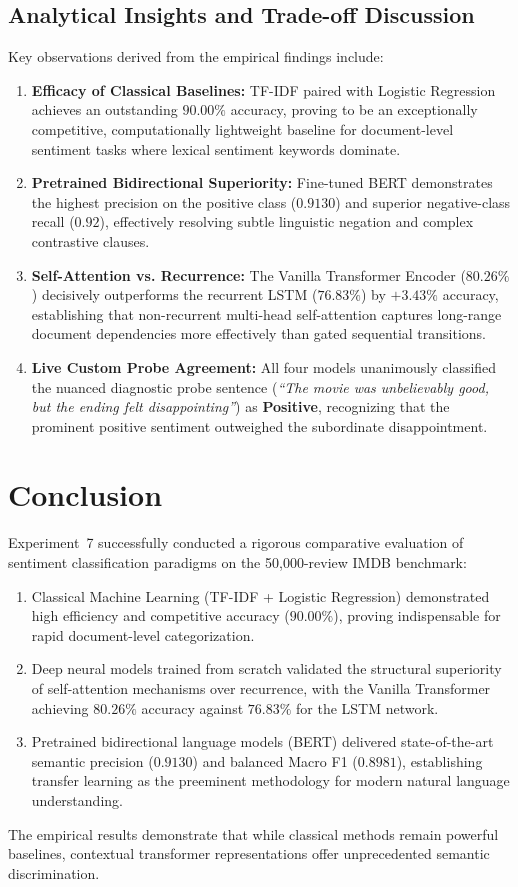 \subsection{Analytical Insights and Trade-off Discussion}
Key observations derived from the empirical findings include:
\begin{enumerate}
    \item \textbf{Efficacy of Classical Baselines:} TF-IDF paired with Logistic Regression achieves an outstanding $90.00\%$ accuracy, proving to be an exceptionally competitive, computationally lightweight baseline for document-level sentiment tasks where lexical sentiment keywords dominate.
    \item \textbf{Pretrained Bidirectional Superiority:} Fine-tuned BERT demonstrates the highest precision on the positive class ($0.9130$) and superior negative-class recall ($0.92$), effectively resolving subtle linguistic negation and complex contrastive clauses.
    \item \textbf{Self-Attention vs. Recurrence:} The Vanilla Transformer Encoder ($80.26\%$) decisively outperforms the recurrent LSTM ($76.83\%$) by $+3.43\%$ accuracy, establishing that non-recurrent multi-head self-attention captures long-range document dependencies more effectively than gated sequential transitions.
    \item \textbf{Live Custom Probe Agreement:} All four models unanimously classified the nuanced diagnostic probe sentence (\textit{``The movie was unbelievably good, but the ending felt disappointing''}) as \textbf{Positive}, recognizing that the prominent positive sentiment outweighed the subordinate disappointment.
\end{enumerate}

\section{Conclusion}
Experiment~7 successfully conducted a rigorous comparative evaluation of sentiment classification paradigms on the 50,000-review IMDB benchmark:
\begin{enumerate}
    \item Classical Machine Learning (TF-IDF + Logistic Regression) demonstrated high efficiency and competitive accuracy ($90.00\%$), proving indispensable for rapid document-level categorization.
    \item Deep neural models trained from scratch validated the structural superiority of self-attention mechanisms over recurrence, with the Vanilla Transformer achieving $80.26\%$ accuracy against $76.83\%$ for the LSTM network.
    \item Pretrained bidirectional language models (BERT) delivered state-of-the-art semantic precision ($0.9130$) and balanced Macro F1 ($0.8981$), establishing transfer learning as the preeminent methodology for modern natural language understanding.
\end{enumerate}
The empirical results demonstrate that while classical methods remain powerful baselines, contextual transformer representations offer unprecedented semantic discrimination.
